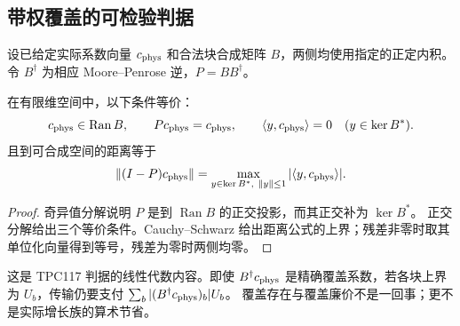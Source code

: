 \subsection{带权覆盖的可检验判据}
设已给定实际系数向量 $c_{\rm phys}$ 和合法块合成矩阵 $B$，两侧均使用指定的正定内积。令 $B^\dagger$ 为相应 Moore--Penrose 逆，$P=BB^\dagger$。
\begin{proposition}[覆盖与正交障碍]
在有限维空间中，以下条件等价：
\[
c_{\rm phys}\in\operatorname{Ran}B,\qquad Pc_{\rm phys}=c_{\rm phys},\qquad
\langle y,c_{\rm phys}\rangle=0\quad(y\in\ker B^*).
\]
且到可合成空间的距离等于
\[
\|(I-P)c_{\rm phys}\|=
\max_{y\in\ker B^*,\ \|y\|\le1}|\langle y,c_{\rm phys}\rangle|.
\]
\end{proposition}
\begin{proof}
奇异值分解说明 $P$ 是到 $\operatorname{Ran}B$ 的正交投影，而其正交补为 $\ker B^*$。
正交分解给出三个等价条件。Cauchy--Schwarz 给出距离公式的上界；残差非零时取其单位化向量得到等号，残差为零时两侧均零。
\end{proof}
这是 TPC117 判据的线性代数内容\cite{archivestructure}。即使 $B^\dagger c_{\rm phys}$ 是精确覆盖系数，若各块上界为 $U_b$，传输仍要支付
$\sum_b|(B^\dagger c_{\rm phys})_b|U_b$。
覆盖存在与覆盖廉价不是一回事；更不是实际增长族的算术节省。
